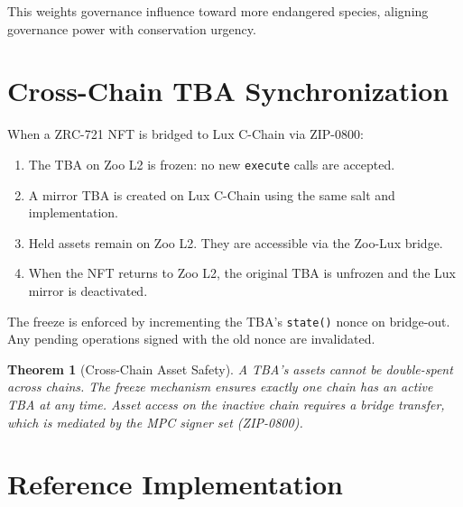 \documentclass[11pt,letterpaper]{article}
\newtheorem{theorem}{Theorem}[section]
\begin{document}
This weights governance influence toward more endangered species, aligning governance power with conservation urgency.

\section{Cross-Chain TBA Synchronization}
\label{sec:crosschain}

When a ZRC-721 NFT is bridged to Lux C-Chain via ZIP-0800:

\begin{enumerate}
    \item The TBA on Zoo L2 is frozen: no new \texttt{execute} calls are accepted.
    \item A mirror TBA is created on Lux C-Chain using the same salt and implementation.
    \item Held assets remain on Zoo L2. They are accessible via the Zoo-Lux bridge.
    \item When the NFT returns to Zoo L2, the original TBA is unfrozen and the Lux mirror is deactivated.
\end{enumerate}

The freeze is enforced by incrementing the TBA's \texttt{state()} nonce on bridge-out. Any pending operations signed with the old nonce are invalidated.

\begin{theorem}[Cross-Chain Asset Safety]
A TBA's assets cannot be double-spent across chains. The freeze mechanism ensures exactly one chain has an active TBA at any time. Asset access on the inactive chain requires a bridge transfer, which is mediated by the MPC signer set (ZIP-0800).
\end{theorem}

\section{Reference Implementation}
\end{document}
